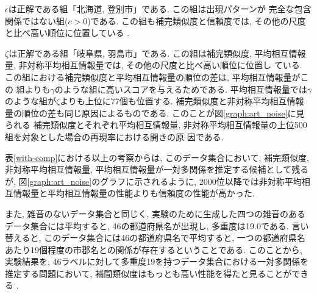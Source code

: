 $\epsilon$は正解である組「北海道, 登別市」である. この組は出現パターンが
完全な包含関係ではない組($c>0$)である. 
この組も補完類似度と信頼度では, その他の尺度と比べ高い順位に位置している
. 

$\zeta$は正解である組「岐阜県, 羽島市」である. 
この組は補完類似度, 平均相互情報量, 非対称平均相互情報量では, その他の尺度と比べ高い順位に位置し
ている. 
この組における補完類似度と平均相互情報量の順位の差は, 平均相互情報量がこの
組よりも$\gamma$のような組に高いスコアを与えるためである. 
平均相互情報量では$\gamma$のような組が$\zeta$よりも上位に77個も位置する. 
補完類似度と非対称平均相互情報量の順位の差も同じ原因によるものである. 
このことが図\ref{graph:art_noise}に見られる
補完類似度とそれぞれ平均相互情報量, 非対称平均相互情報量の上位500組を対象とした場合の再現率における開きの原
因である. 

表\ref{with-comp}における以上の考察からは, このデータ集合において, 
補完類似度, 非対称平均相互情報量, 平均相互情報量が一対多関係を推定する候補として残る
が, 図\ref{graph:art_noise}のグラフに示されるように, 
2000位以降では非対称平均相互情報量と平均相互情報量の性能よりも信頼度の性能が高かった. 

また, 雑音のないデータ集合と同じく,
実験のために生成した四つの雑音のあるデータ集合には平均すると, 
46の都道府県名が出現し, 多重度は19.0である. 
言い替えると, このデータ集合には46の都道府県名で平均すると, 
一つの都道府県名あたり19個程度の市郡名との関係が存在するということである. 
このことから, 実験結果を, 
46ラベルに対して多重度19を持つデータ集合における一対多関係を
推定する問題において, 補間類似度はもっとも高い性能を得たと見ることができる
. 

